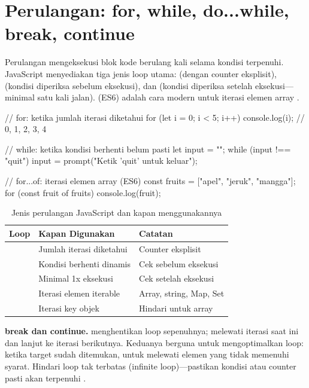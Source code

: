 ﻿\section{Perulangan: for, while, do...while, break, continue}

Perulangan mengeksekusi blok kode berulang kali selama kondisi terpenuhi. JavaScript menyediakan tiga jenis loop utama:  (dengan counter eksplisit),  (kondisi diperiksa sebelum eksekusi), dan  (kondisi diperiksa setelah eksekusi---minimal satu kali jalan).  (ES6) adalah cara modern untuk iterasi elemen array \cite{jsInfo}.

\begin{webcode}[language=JavaScript, caption={Tiga jenis perulangan dan for...of}]
// for: ketika jumlah iterasi diketahui
for (let i = 0; i < 5; i++) {
  console.log(i); // 0, 1, 2, 3, 4
}

// while: ketika kondisi berhenti belum pasti
let input = "";
while (input !== "quit") {
  input = prompt("Ketik 'quit' untuk keluar");
}

// for...of: iterasi elemen array (ES6)
const fruits = ["apel", "jeruk", "mangga"];
for (const fruit of fruits) {
  console.log(fruit);
}
\end{webcode}

\begin{table}[H]
\centering
\begin{tabular}{|P{2.5cm}|P{4.5cm}|P{5cm}|}
\hline
\textbf{Loop} & \textbf{Kapan Digunakan} & \textbf{Catatan} \\
\hline
{} & Jumlah iterasi diketahui & Counter  eksplisit \\
\hline
{} & Kondisi berhenti dinamis & Cek sebelum eksekusi \\
\hline
{} & Minimal 1x eksekusi & Cek setelah eksekusi \\
\hline
{} & Iterasi elemen iterable & Array, string, Map, Set \\
\hline
{} & Iterasi key objek & Hindari untuk array \\
\hline
\end{tabular}
\caption{Jenis perulangan JavaScript dan kapan menggunakannya}
\end{table}

\begin{catatan}
\textbf{break dan continue.}  menghentikan loop sepenuhnya;  melewati iterasi saat ini dan lanjut ke iterasi berikutnya. Keduanya berguna untuk mengoptimalkan loop:  ketika target sudah ditemukan,  untuk melewati elemen yang tidak memenuhi syarat. Hindari loop tak terbatas (infinite loop)---pastikan kondisi  atau counter  pasti akan terpenuhi \cite{mdnJsGuide}.
\end{catatan}

